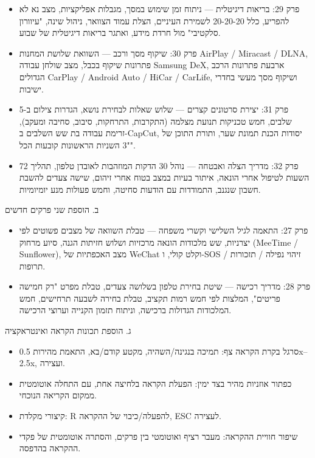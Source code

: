\begin{itemize}
  \item פרק 29: בריאות דיגיטלית — ניתוח זמן שימוש במסך, מגבלות אפליקציות, מצב נא לא להפריע, כלל 20-20-20 לשמירת העיניים, הצלת עמוד הצוואר, ניהול שינה, "עיוורון סלקטיבי" מול חרדת מידע, ואתגר בריאות דיגיטלית של שבוע.
  \item פרק 30: שיקוף מסך ורכב — השוואת שלושת המחנות AirPlay / Miracast / DLNA, פתרונות שיקוף בכבל, מצב שולחן עבודה Samsung DeX, ארבעת פתרונות הרכב הגדולים CarPlay / Android Auto / HiCar / CarLife, ושיקוף מסך מעשי בחדרי ישיבות.
  \item פרק 31: יצירת סרטונים קצרים — שלוש שאלות לבחירת נושא, הגדרות צילום ב-5 שלבים, חמש טכניקות תנועת מצלמה (התקרבות, התרחקות, סיבוב, סחיבה ומעקב), זרימת עבודה בת שש השלבים ב-CapCut, יסודות הכנת תמונת שער, ותורת התוכן של "3 השניות הראשונות קובעות הכל".
  \item פרק 32: מדריך הצלה ואבטחה — נוהל 30 הדקות המוזהבות לאובדן טלפון, תהליך 72 השעות לטיפול אחרי הונאה, איתור בעיות במצב בטוח אחרי זיהום, שישה צעדים להשבת חשבון שנגנב, התמודדות עם הודעות סחיטה, וחמש פעולות מנע יומיומיות.
\end{itemize}

ב. הוספת שני פרקים חדשים

\begin{itemize}
  \item פרק 27: התאמה לגיל השלישי וקשרי משפחה — טבלת השוואה של מצבים פשוטים לפי יצרניות, שש מלכודות הונאה מרכזיות ושלוש חזיתות הגנה, סיוע מרחוק (MeeTime / Sunflower), מצב האכפתיות של WeChat וקלט קולי, ו-SOS / זיהוי נפילה / תזכורות תרופות.
  \item פרק 28: מדריך רכישה — שיטת בחירת טלפון בשלושה צעדים, טבלת מפרט "רק חמישה פריטים", המלצות לפי חמש רמות תקציב, טבלת בחירה לשבעה תרחישים, חמש המלכודות הגדולות ברכישה, וניתוח תזמון הקנייה וערוצי הרכישה.
\end{itemize}

ג. הוספת תכונות הקראה ואינטראקציה

\begin{itemize}
  \item סרגל בקרת הקראה צף: תמיכה בנגינה/השהיה, מקטע קודם/בא, התאמת מהירות 0.5x–2.5x, ועצירה.
  \item כפתור אוזניות מהיר בצד ימין: הפעלת הקראה בלחיצה אחת, עם התחלה אוטומטית ממקום הקריאה הנוכחי.
  \item קיצורי מקלדת: R להפעלה/כיבוי של ההקראה, ESC לעצירה.
  \item שיפור חוויית ההקראה: מעבר רציף ואוטומטי בין פרקים, והסתרה אוטומטית של פקדי ההקראה בהדפסה.
\end{itemize}

